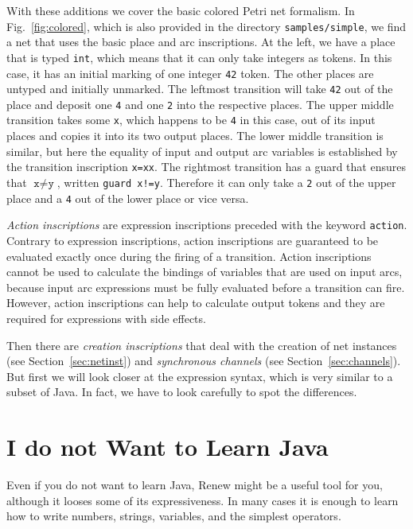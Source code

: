 With these additions we cover the basic colored
Petri net formalism. In Fig.~\ref{fig:colored}, which is
also provided in the directory \texttt{samples/simple}, we find a net
that uses the basic place and arc inscriptions. At the left,
we have a place that is typed \texttt{int}, which means that it
can only take integers as tokens. In this case, it has an initial
marking of one integer \texttt{42} token. The other places
are untyped and initially unmarked. The leftmost transition
will take \texttt{42} out of the place and deposit one \texttt{4}
and one \texttt{2} into the respective places. The upper middle
transition takes some \texttt{x}, which happens to be \texttt{4}
in this case, out of its input places and copies it into its
two output places. The lower middle transition is similar,
but here the equality of input and output arc variables
is established by the transition inscription \texttt{x=xx}.
The rightmost transition has a guard that ensures that
$\texttt{x}\neq \texttt{y}$, written \texttt{guard x!=y}.
Therefore it can only take a \texttt{2} out of the upper place
and a \texttt{4} out of the lower place or vice versa.

\emph{Action inscriptions} are expression inscriptions preceded with the
keyword \texttt{action}. Contrary to expression inscriptions,
action inscriptions are guaranteed to be evaluated exactly once during
the firing of a transition. Action inscriptions cannot be used
to calculate the bindings of variables that are used on input arcs,
because input arc expressions must be fully evaluated before a transition
can fire. However, action inscriptions can help to calculate output
tokens and they are required for expressions with side effects.

Then there are \emph{creation inscriptions} that deal with the creation
of net instances (see Section~\ref{sec:netinst}) and
\emph{synchronous channels}
(see Section~\ref{sec:channels}). But first we will look closer
at the expression syntax, which is very similar to a subset of Java.
In fact, we have to look carefully to spot the differences.


\section{I do not Want to Learn Java}

Even if you do not want to learn Java, Renew might be a useful
tool for you, although it looses some of its expressiveness.
In many cases it is enough to learn how to write numbers,
strings, variables, and the simplest operators.

